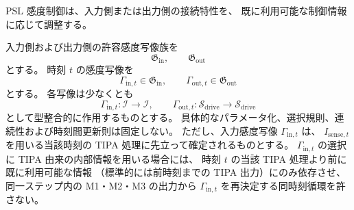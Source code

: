PSL 感度制御は、入力側または出力側の接続特性を、
既に利用可能な制御情報に応じて調整する。

\begin{definition}
\label{def:psl_sensitivity}
入力側および出力側の許容感度写像族を
\[
  \mathfrak G_{\mathrm{in}},
  \qquad
  \mathfrak G_{\mathrm{out}}
\]
とする。
時刻 $t$ の感度写像を
\[
  \Gamma_{\mathrm{in},t}\in\mathfrak G_{\mathrm{in}},
  \qquad
  \Gamma_{\mathrm{out},t}\in\mathfrak G_{\mathrm{out}}
\]
とする。
各写像は少なくとも
\[
  \Gamma_{\mathrm{in},t}:\mathcal I\to\mathcal I,
  \qquad
  \Gamma_{\mathrm{out},t}:\mathcal S_{\mathrm{drive}}\to \mathcal S_{\mathrm{drive}}
\]
として型整合的に作用するものとする。
具体的なパラメータ化、選択規則、連続性および時刻間更新則は固定しない。
ただし、入力感度写像 $\Gamma_{\mathrm{in},t}$ は、
$I_{\mathrm{sense},t}$ を用いる当該時刻の TIPA 処理に先立って確定されるものとする。
$\Gamma_{\mathrm{in},t}$ の選択に TIPA 由来の内部情報を用いる場合には、
時刻 $t$ の当該 TIPA 処理より前に既に利用可能な情報
（標準的には前時刻までの TIPA 出力）にのみ依存させ、
同一ステップ内の M1・M2・M3 の出力から
$\Gamma_{\mathrm{in},t}$ を再決定する同時刻循環を許さない。
\end{definition}
